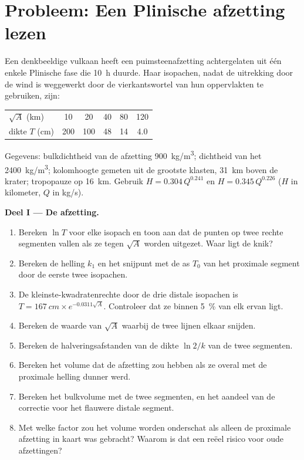\section{Probleem: Een Plinische afzetting lezen}

\begin{problem}
\label{pb:b2:eruptive-styles:1}
Een denkbeeldige vulkaan heeft een puimsteenafzetting achtergelaten uit één enkele Plinische fase die
\qty{10}{\hour} duurde. Haar isopachen, nadat de uitrekking door de wind is weggewerkt door
de vierkantswortel van hun oppervlakten te gebruiken, zijn:
\begin{center}
\small
\begin{tabular}{lccccc}
\hline
$\sqrt A$ (\unit{km}) & 10 & 20 & 40 & 80 & 120 \\
dikte $T$ (\unit{cm}) & 200 & 100 & 48 & 14 & 4.0 \\
\hline
\end{tabular}
\end{center}
Gegevens: bulkdichtheid van de afzetting \qty{900}{kg/m^3}; dichtheid van het 
\qty{2400}{kg/m^3}; kolomhoogte gemeten uit de grootste klasten,
\qty{31}{km} boven de krater; tropopauze op \qty{16}{km}. Gebruik $H =
0.304\,Q^{0.241}$ en $H = 0.345\,Q^{0.226}$ ($H$ in kilometer, $Q$ in
\unit{kg/s}).

\medskip\noindent\textbf{Deel I --- De afzetting.}
\begin{enumerate}
\item Bereken $\ln T$ voor elke isopach en toon aan dat de punten op twee
rechte segmenten vallen als ze tegen $\sqrt A$ worden uitgezet. Waar ligt de knik?
\item Bereken de helling $k_1$ en het snijpunt met de as $T_0$ van het proximale segment
door de eerste twee isopachen.
\item De kleinste-kwadratenrechte door de drie distale isopachen is $T =
\qty{167}{cm}\times e^{-0.0311\sqrt A}$. Controleer dat ze binnen
\qty{5}{\percent} van elk ervan ligt.
\item Bereken de waarde van $\sqrt A$ waarbij de twee lijnen elkaar snijden.
\item Bereken de halveringsafstanden van de dikte $\ln 2/k$ van de twee segmenten.
\item Bereken het volume dat de afzetting zou hebben als ze overal met de proximale
helling dunner werd.
\item Bereken het bulkvolume met de twee segmenten, en het aandeel van
de correctie voor het flauwere distale segment.
\item Met welke factor zou het volume worden onderschat als alleen de proximale
afzetting in kaart was gebracht? Waarom is dat een reëel risico voor oude afzettingen?
\end{enumerate}


\end{problem}
